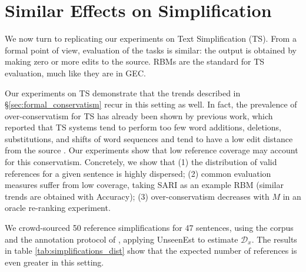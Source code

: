 \documentclass[letterpaper, 11pt]{article}
\newcommand{\oa}[1]{\footnote{\color{red}OA: #1}}
\begin{document}



\section{Similar Effects on Simplification}\label{sec:simplification}

We now turn to replicating our experiments on Text Simplification (TS). From a formal point of view, evaluation of the tasks is similar:
the output is obtained by making zero or more edits to the source. RBMs are the standard for TS evaluation,
much like they are in GEC.

Our experiments on TS demonstrate that the trends described in \S\ref{sec:formal_conservatism} recur in this setting as well. 
In fact, the prevalence of over-conservatism for TS has already been shown by previous work, 
which reported that TS systems tend to perform too few word additions, deletions,
substitutions, and shifts of word sequences \cite{zhang2017sentence} 
and tend to have a low edit distance from the source \cite{narayan2015unsupervised}.
Our experiments show that low reference coverage may account for this conservatism. Concretely, we show that
(1) the distribution of valid references for a given sentence is highly dispersed; 
(2) common evaluation measures suffer from low coverage, taking SARI \cite{Xu-EtAl:2016:TACL} 
as an example RBM (similar trends are obtained with Accuracy); 
(3) over-conservatism decreases with $M$ in an oracle re-ranking experiment.

We crowd-sourced 50 reference simplifications for 47 sentences, using the corpus and the annotation protocol of 
, applying {\sc UnseenEst} to estimate $\mathcal{D}_x$.
The results in table \ref{tab:simplifications_dist} show that the expected number of references is even greater in this setting. 
\end{document}

